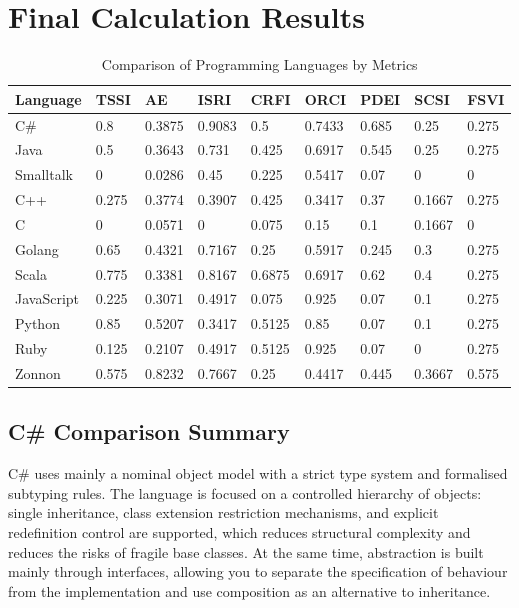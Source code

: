 \section{Final Calculation Results}

\begin{table}[h]
\centering
\caption{Comparison of Programming Languages by Metrics}
\label{tab:languages_metrics}
\begin{tabularx}{\textwidth}{|l|X|X|X|X|X|X|X|X|}
\hline
\textbf{Language} & 
\textbf{TSSI} & 
\textbf{AE} & 
\textbf{ISRI} & 
\textbf{CRFI} & 
\textbf{ORCI} & 
\textbf{PDEI} & 
\textbf{SCSI} & 
\textbf{FSVI} \\
\hline

C\# & 0.8 & 0.3875 & 0.9083 & 0.5 & 0.7433 & 0.685 & 0.25 & 0.275 \\ \hline
Java & 0.5 & 0.3643 & 0.731 & 0.425 & 0.6917 & 0.545 & 0.25 & 0.275 \\ \hline
Smalltalk & 0 & 0.0286 & 0.45 & 0.225 & 0.5417 & 0.07 & 0 & 0 \\ \hline
C++ & 0.275 & 0.3774 & 0.3907 & 0.425 & 0.3417 & 0.37 & 0.1667 & 0.275 \\ \hline
C & 0 & 0.0571 & 0 & 0.075 & 0.15 & 0.1 & 0.1667 & 0 \\ \hline
Golang & 0.65 & 0.4321 & 0.7167 & 0.25 & 0.5917 & 0.245 & 0.3 & 0.275 \\ \hline
Scala & 0.775 & 0.3381 & 0.8167 & 0.6875 & 0.6917 & 0.62 & 0.4 & 0.275 \\ \hline
JavaScript & 0.225 & 0.3071 & 0.4917 & 0.075 & 0.925 & 0.07 & 0.1 & 0.275 \\ \hline
Python & 0.85 & 0.5207 & 0.3417 & 0.5125 & 0.85 & 0.07 & 0.1 & 0.275 \\ \hline
Ruby & 0.125 & 0.2107 & 0.4917 & 0.5125 & 0.925 & 0.07 & 0 & 0.275 \\ \hline
Zonnon & 0.575 & 0.8232 & 0.7667 & 0.25 & 0.4417 & 0.445 & 0.3667 & 0.575 \\ \hline

\end{tabularx}
\end{table}

\subsection{C\# Comparison Summary}

C\# uses mainly a nominal object model with a strict type system and formalised subtyping rules. The language is focused on a controlled hierarchy of objects: single inheritance, class extension restriction mechanisms, and explicit redefinition control are supported, which reduces structural complexity and reduces the risks of fragile base classes. At the same time, abstraction is built mainly through interfaces, allowing you to separate the specification of behaviour from the implementation and use composition as an alternative to inheritance.

